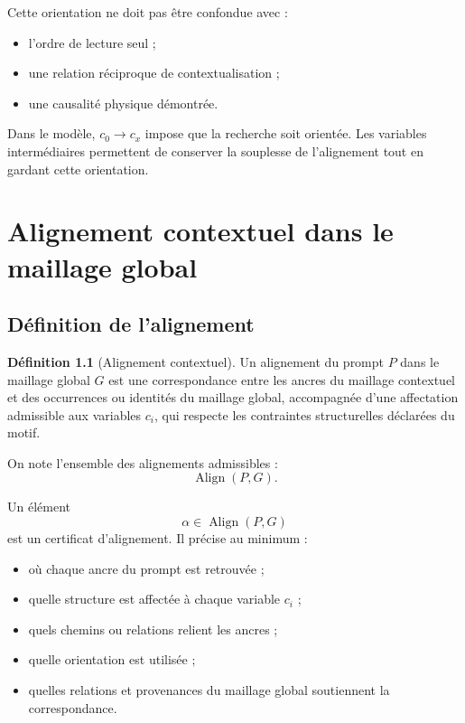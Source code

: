 \documentclass[11pt,a4paper]{report}
\theoremstyle{definition}
\newtheorem{definition}{Définition}[chapter]
\theoremstyle{plain}
\theoremstyle{remark}
\newcommand{\Align}{\operatorname{Align}}
\begin{document}
Cette orientation ne doit pas être confondue avec :
\begin{itemize}
  \item l'ordre de lecture seul ;
  \item une relation réciproque de contextualisation ;
  \item une causalité physique démontrée.
\end{itemize}

Dans le modèle, \(c_0\to c_x\) impose que la recherche soit
orientée. Les variables intermédiaires permettent de conserver
la souplesse de l'alignement tout en gardant cette orientation.

\chapter{Alignement contextuel dans le maillage global}

\section{Définition de l'alignement}

\begin{definition}[Alignement contextuel]
Un alignement du prompt \(P\) dans le maillage global \(G\) est
une correspondance entre les ancres du maillage contextuel et
des occurrences ou identités du maillage global, accompagnée
d'une affectation admissible aux variables \(c_i\), qui respecte
les contraintes structurelles déclarées du motif.
\end{definition}

On note l'ensemble des alignements admissibles :
\[
\Align(P,G).
\]

Un élément
\[
\alpha\in\Align(P,G)
\]
est un certificat d'alignement. Il précise au minimum :
\begin{itemize}
  \item où chaque ancre du prompt est retrouvée ;
  \item quelle structure est affectée à chaque variable \(c_i\) ;
  \item quels chemins ou relations relient les ancres ;
  \item quelle orientation est utilisée ;
  \item quelles relations et provenances du maillage global
        soutiennent la correspondance.
\end{itemize}
\end{document}
